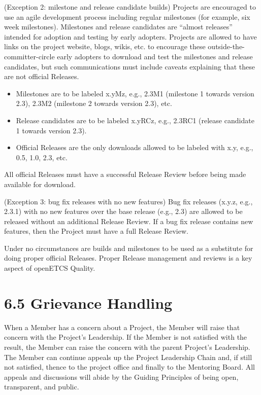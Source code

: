 (Exception 2: milestone and release candidate builds) Projects are
encouraged to use an agile development process including regular
milestones (for example, six week milestones). Milestones and release
candidates are ``almost releases'' intended for adoption and testing by
early adopters. Projects are allowed to have links on the project
website, blogs, wikis, etc. to encourage these
outside-the-committer-circle early adopters to download and test the
milestones and release candidates, but such communications must include
caveats explaining that these are not official Releases.

\begin{itemize}

\item
  Milestones are to be labeled x.yMz, e.g., 2.3M1 (milestone 1 towards
  version 2.3), 2.3M2 (milestone 2 towards version 2.3), etc.
\item
  Release candidates are to be labeled x.yRCz, e.g., 2.3RC1 (release
  candidate 1 towards version 2.3).
\item
  Official Releases are the only downloads allowed to be labeled with
  x.y, e.g., 0.5, 1.0, 2.3, etc.
\end{itemize}

All official Releases must have a successful Release Review before being
made available for download.

(Exception 3: bug fix releases with no new features) Bug fix releases
(x.y.z, e.g., 2.3.1) with no new features over the base release (e.g.,
2.3) are allowed to be released without an additional Release Review. If
a bug fix release contains new features, then the Project must have a
full Release Review.

Under no circumstances are builds and milestones to be used as a
substitute for doing proper official Releases. Proper Release management
and reviews is a key aspect of openETCS Quality.


\section{6.5 Grievance Handling}

When a Member has a concern about a Project, the Member will raise that
concern with the Project's Leadership. If the Member is not satisfied
with the result, the Member can raise the concern with the parent
Project's Leadership. The Member can continue appeals up the Project
Leadership Chain and, if still not satisfied, thence to the project
office and finally to the Mentoring Board. All appeals and discussions
will abide by the Guiding Principles of being open, transparent, and
public.

